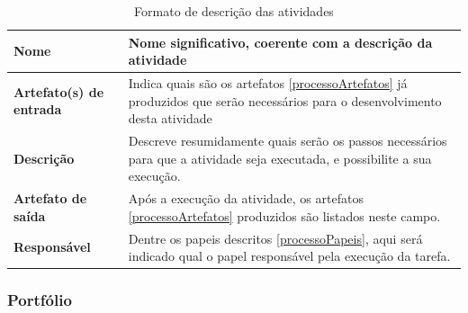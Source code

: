 \begin{table}[H]
    \centering
    \label{descricaoAtividades}
    \caption{Formato de descrição das atividades}
        \begin{tabular}{|l|p{10cm}|}
        \hline
        \textbf{Nome} & Nome significativo, coerente com a descrição da atividade \\
        \hline
        \textbf{Artefato(s) de entrada} & Indica quais são os artefatos \ref{processoArtefatos} já produzidos que serão necessários para o desenvolvimento desta atividade \\
        \hline
        \textbf{Descrição} & Descreve resumidamente quais serão os passos necessários para que a atividade seja executada, e possibilite a sua execução. \\
        \hline
        \textbf{Artefato de saída} & Após a execução da atividade, os artefatos \ref{processoArtefatos} produzidos são listados neste campo. \\
        \hline
        \textbf{Responsável} & Dentre os papeis descritos \ref{processoPapeis}, aqui será indicado qual o papel responsável pela execução da tarefa.\\
        \hline
    \end{tabular}
\end{table}

\subsubsection{Portfólio}


